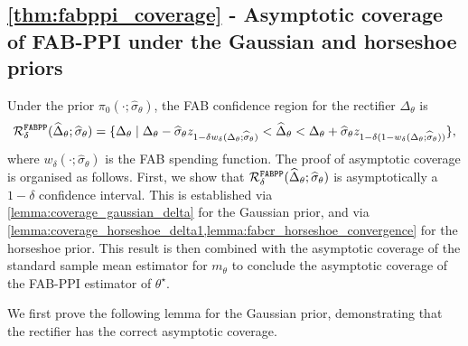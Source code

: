 \subsection{\cref{thm:fabppi_coverage} - Asymptotic coverage of FAB-PPI under the Gaussian and horseshoe priors}
\label{app:thm:fabppi_coverage}
Under the prior $\pi_0(\cdot; \widehat{\sigma}_\theta )$, the FAB confidence region for the rectifier $\Delta_\theta$ is
\begin{align}
    \mathcal R^{\mathrm{\texttt{FABPP}}}_\delta(\widehat{\Delta}_\theta; \widehat{\sigma}_\theta )=\{\Delta_\theta  \mid \Delta_\theta -\widehat{\sigma}_\theta z_{1-\delta w_\delta(\Delta_\theta; \widehat{\sigma}_\theta)}<\widehat\Delta_\theta<\Delta_\theta + \widehat{\sigma}_\theta z_{1-\delta(1-w_\delta(\Delta_\theta; \widehat{\sigma}_\theta))}\},
\label{eq:FABdelta}
\end{align}
where $w_\delta(\cdot; \widehat{\sigma}_\theta)$ is the FAB spending function. The proof of asymptotic coverage is organised as follows. First, we show that $\mathcal R^{\mathrm{\texttt{FABPP}}}_\delta(\widehat{\Delta}_\theta; \widehat{\sigma}_\theta )$ is asymptotically a $1-\delta$ confidence interval. This is established via \cref{lemma:coverage_gaussian_delta} for the Gaussian prior, and via \cref{lemma:coverage_horseshoe_delta1,lemma:fabcr_horseshoe_convergence} for the horseshoe prior. This result is then combined with the asymptotic coverage of the standard sample mean estimator for $m_\theta$ to conclude the asymptotic coverage of the FAB-PPI estimator of $\theta^\star$.

We first prove the following lemma for the Gaussian prior, demonstrating that the rectifier has the correct asymptotic coverage.
 
